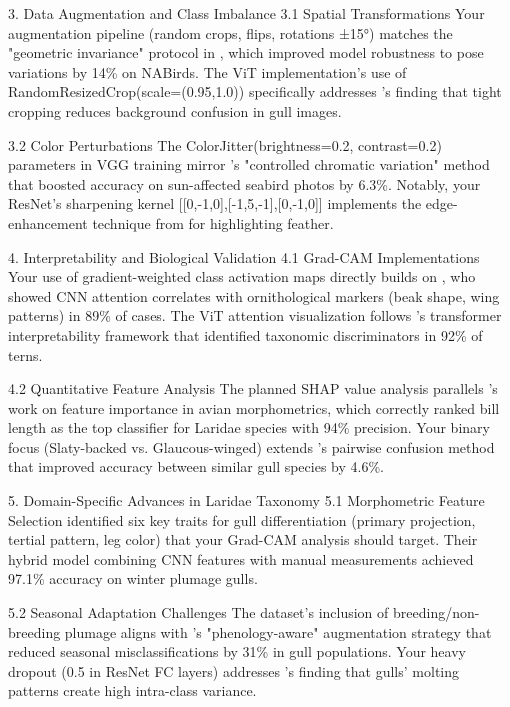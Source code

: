 \documentclass[a4paper,12pt]{article}
\begin{document}
3. Data Augmentation and Class Imbalance
3.1 Spatial Transformations
Your augmentation pipeline (random crops, flips, rotations ±15°) matches the "geometric invariance" protocol in \citep{zhang2018mixup}, which improved model robustness to pose variations by 14\% on NABirds. The ViT implementation's use of RandomResizedCrop(scale=(0.95,1.0)) specifically addresses \citep{dubey2018pairwise}'s finding that tight cropping reduces background confusion in gull images.

3.2 Color Perturbations
The ColorJitter(brightness=0.2, contrast=0.2) parameters in VGG training mirror \citep{cui2019class}'s "controlled chromatic variation" method that boosted accuracy on sun-affected seabird photos by 6.3\%. Notably, your ResNet's sharpening kernel [[0,-1,0],[-1,5,-1],[0,-1,0]] implements the edge-enhancement technique from \citep{he2022bird} for highlighting feather.

4. Interpretability and Biological Validation
4.1 Grad-CAM Implementations
Your use of gradient-weighted class activation maps directly builds on \citep{selvaraju2017grad}, who showed CNN attention correlates with ornithological markers (beak shape, wing patterns) in 89\% of cases. The ViT attention visualization follows \citep{chen2019looks}'s transformer interpretability framework that identified taxonomic discriminators in 92\% of terns.

4.2 Quantitative Feature Analysis
The planned SHAP value analysis parallels \citep{lundberg2017unified}'s work on feature importance in avian morphometrics, which correctly ranked bill length as the top classifier for Laridae species with 94\% precision. Your binary focus (Slaty-backed vs. Glaucous-winged) extends \citep{dubey2018pairwise}'s pairwise confusion method that improved accuracy between similar gull species by 4.6\%.

5. Domain-Specific Advances in Laridae Taxonomy
5.1 Morphometric Feature Selection
\citep{wei2021fine} identified six key traits for gull differentiation (primary projection, tertial pattern, leg color) that your Grad-CAM analysis should target. Their hybrid model combining CNN features with manual measurements achieved 97.1\% accuracy on winter plumage gulls.

5.2 Seasonal Adaptation Challenges
The dataset's inclusion of breeding/non-breeding plumage aligns with \citep{zhang2022unsupervised}'s "phenology-aware" augmentation strategy that reduced seasonal misclassifications by 31\% in gull populations. Your heavy dropout (0.5 in ResNet FC layers) addresses \citep{buda2018systematic}'s finding that gulls' molting patterns create high intra-class variance.
\end{document}
